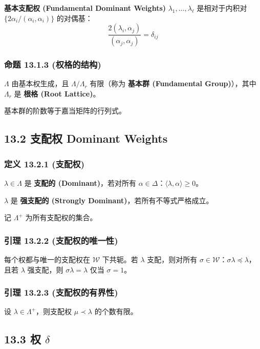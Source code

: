 \textbf{基本支配权 (Fundamental Dominant Weights)} $\lambda_1, \ldots, \lambda_\ell$ 是相对于内积对 $\{2\alpha_i/(\alpha_i, \alpha_i)\}$ 的对偶基：
\[
\frac{2(\lambda_i, \alpha_j)}{(\alpha_j, \alpha_j)} = \delta_{ij}
\]

\subsubsection{命题 13.1.3 (权格的结构)}

$\Lambda$ 由基本权生成，且 $\Lambda/\Lambda_r$ 有限（称为 \textbf{基本群 (Fundamental Group)}），其中 $\Lambda_r$ 是 \textbf{根格 (Root Lattice)}。

基本群的阶数等于嘉当矩阵的行列式。

\subsection{13.2 支配权 Dominant Weights}

\subsubsection{定义 13.2.1 (支配权)}

$\lambda \in \Lambda$ 是 \textbf{支配的 (Dominant)}，若对所有 $\alpha \in \Delta$：$\langle\lambda, \alpha\rangle \geq 0$。

$\lambda$ 是 \textbf{强支配的 (Strongly Dominant)}，若所有不等式严格成立。

记 $\Lambda^+$ 为所有支配权的集合。

\subsubsection{引理 13.2.2 (支配权的唯一性)}

每个权都与唯一的支配权在 $\mathcal{W}$ 下共轭。若 $\lambda$ 支配，则对所有 $\sigma \in \mathcal{W}$：$\sigma \lambda \preceq \lambda$，且若 $\lambda$ 强支配，则 $\sigma \lambda = \lambda$ 仅当 $\sigma = 1$。

\subsubsection{引理 13.2.3 (支配权的有界性)}

设 $\lambda \in \Lambda^+$，则支配权 $\mu \prec \lambda$ 的个数有限。

\subsection{13.3 权 \texorpdfstring{$\delta$}{delta}}

